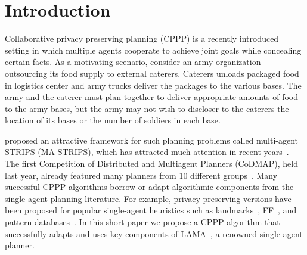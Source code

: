 \documentclass[letterpaper]{article}
\theoremstyle{definition}
\begin{document}
\section{Introduction}

Collaborative privacy preserving planning (CPPP) is a recently introduced setting in which multiple agents cooperate to achieve joint goals while concealing certain facts. As a motivating scenario, consider an army organization outsourcing its food supply to external caterers. Caterers unloads packaged food in logistics center and army trucks deliver the packages to the various bases. The army and the caterer must plan together to deliver appropriate amounts of food to the army bases, but the army may not wish to discloser to the caterers the location of its bases or the number of soldiers in each base. %


\cite{brafman2013complexity} proposed an attractive framework for such planning problems called multi-agent STRIPS (MA-STRIPS), which has attracted much attention in recent  years~\citep{tozicak2015onInternally,torreno2015global,vstolba2014relaxation,maliah2014privacyPreserving}. The first Competition of Distributed and Multiagent Planners (CoDMAP), held last year, already featured many planners from 10 different groups~\cite{vstolba2015competition}.
Many successful CPPP algorithms borrow or adapt algorithmic components from the single-agent planning literature. For example, privacy preserving versions have been proposed for popular single-agent heuristics such as landmarks~\citep{maliah2014privacyPreserving,torreno2015global,vstolba2015admissible}, FF~\citep{vstolba2014relaxation}, and pattern databases~\citep{maliah2015privacy}. In this short paper we propose a CPPP algorithm that successfully adapts and uses key components of LAMA~\citep{richter2010lama}, a renowned single-agent planner.
\end{document}
